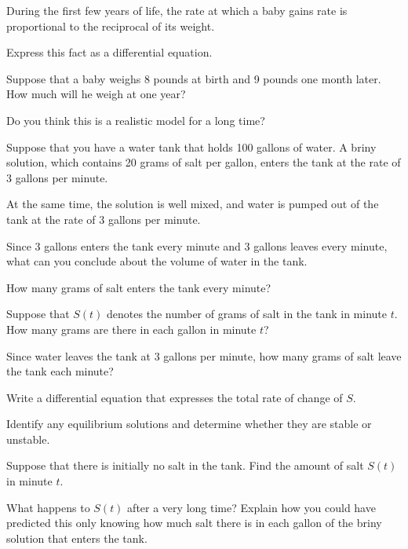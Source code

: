 \begin{exercises}
    \item During the first few years of life, the rate at which a baby
      gains rate is proportional to the reciprocal of its weight.

      \ba
      \item Express this fact as a differential equation.

      \item Suppose that a baby weighs 8 pounds at birth and 9 pounds
        one month later.  How much will he weigh at one year?
      \item Do you think this is a realistic model for a long time?
        \ea

\item  Suppose that you have a water tank that holds 100 gallons of water.
  A briny solution, which contains 20 grams of salt per gallon, enters
  the tank at the rate of 3 gallons per minute.

  At the same time, the solution is well mixed, and water is pumped
  out of the tank at the rate of 3 gallons per minute.

\ba
\item Since 3 gallons enters the tank every minute and 3 gallons
  leaves every minute, what can you conclude about the volume of water
  in the tank.

\item How many grams of salt enters the tank every minute?

\item Suppose that $S(t)$ denotes the number of grams of salt in the
  tank in minute $t$.  How many grams are there in each gallon in
  minute $t$?

\item Since water leaves the tank at 3 gallons per minute, how many
  grams of salt leave the tank each minute? 

\item Write a differential equation that expresses the total rate of
  change of $S$.

\item Identify any equilibrium solutions and determine whether they
  are stable or unstable.

\item Suppose that there is initially no salt in the tank.  Find the
  amount of salt $S(t)$ in minute $t$.

\item What happens to $S(t)$ after a very long time?  Explain how you
  could have predicted this only knowing how much salt there is in
  each gallon of the
  briny solution that enters the tank.
\ea

\end{exercises}
\afterexercises


